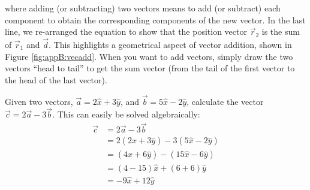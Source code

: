 where adding (or subtracting) two vectors means to add (or subtract) each component to obtain the corresponding components of the new vector. In the last line, we re-arranged the equation to show that the position vector $\vec r_2$ is the sum of $\vec r_1$ and $\vec d$. This highlights a geometrical aspect of vector addition, shown in Figure \ref{fig:appB:vecadd}. When you want to add vectors, simply draw the two vectors ``head to tail'' to get the sum vector (from the tail of the first vector to the head of the last vector).

\begin{example}{Given two vectors, $\vec a=2\hat x+3\hat y$, and $\vec b=5\hat x-2\hat y$, calculate the vector $\vec c= 2\vec a- 3\vec b$.}
This can easily be solved algebraically:
\begin{align*}
\vec c &= 2\vec a- 3\vec b\\
&=2 (2\hat x+3\hat y) - 3 (5\hat x-2\hat y) \\
&=(4\hat x+6\hat y)-(15\hat x-6\hat y) \\
&=(4-15)\hat x + (6+6) \hat y\\
&= -9 \hat x + 12 \hat y
\end{align*}
\end{example}


